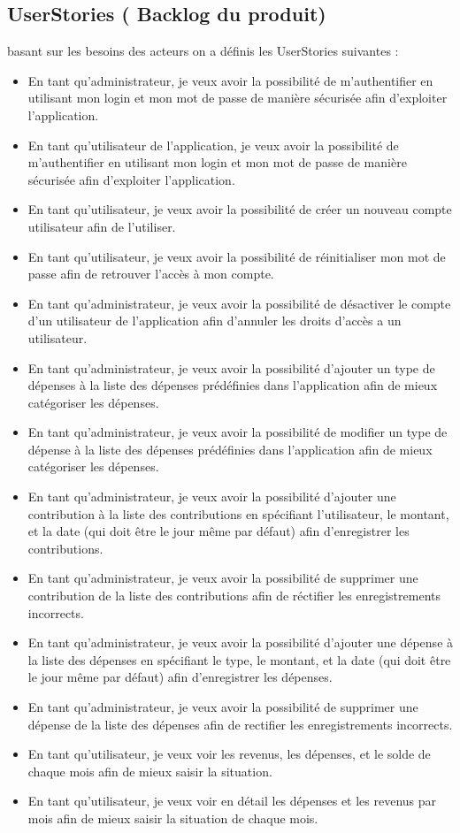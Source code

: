 \subsection{UserStories ( Backlog du produit)}
    basant sur les besoins des acteurs on a définis les UserStories suivantes : 
    \begin{itemize}
        \item En tant qu'administrateur, je veux avoir la possibilité de m'authentifier en utilisant mon login et mon mot de passe de manière sécurisée afin d'exploiter l'application.
        \item En tant qu'utilisateur de l'application, je veux avoir la possibilité de m'authentifier en utilisant mon login et mon mot de passe de manière sécurisée afin d'exploiter l'application.    
        \item En tant qu'utilisateur, je veux avoir la possibilité de créer un nouveau compte utilisateur afin de l'utiliser.
        \item En tant qu'utilisateur, je veux avoir la possibilité de réinitialiser mon mot de passe afin de retrouver l'accès à mon compte.
        \item En tant qu'administrateur, je veux avoir la possibilité de désactiver le compte d'un utilisateur de l'application afin d'annuler les droits d'accès a un utilisateur.
        \item En tant qu'administrateur, je veux avoir la possibilité d'ajouter un type de dépenses à la liste des dépenses prédéfinies dans l'application afin de mieux catégoriser les dépenses.
        \item En tant qu'administrateur, je veux avoir la possibilité de modifier un type de dépense à la liste des dépenses prédéfinies dans l'application afin de mieux catégoriser les dépenses.
        \item En tant qu'administrateur, je veux avoir la possibilité d'ajouter une contribution à la liste des contributions en spécifiant l'utilisateur, le montant, et la date (qui doit être le jour même par défaut) afin d'enregistrer les contributions.
        \item En tant qu'administrateur, je veux avoir la possibilité de supprimer une contribution de la liste des contributions afin de réctifier les enregistrements incorrects.
        \item En tant qu'administrateur, je veux avoir la possibilité d'ajouter une dépense à la liste des dépenses en spécifiant le type, le montant, et la date (qui doit être le jour même par défaut) afin d'enregistrer les dépenses.
        \item En tant qu'administrateur, je veux avoir la possibilité de supprimer une dépense de la liste des dépenses afin de rectifier les enregistrements incorrects.
        \item En tant qu'utilisateur, je veux voir les revenus, les dépenses, et le solde de chaque mois afin de mieux saisir la situation.
        \item En tant qu'utilisateur, je veux voir en détail les dépenses et les revenus par mois afin de mieux saisir la situation de chaque mois.
    \end{itemize} 
